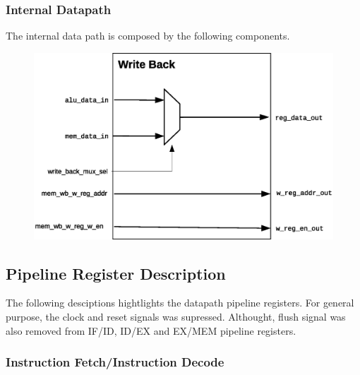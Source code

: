 \documentclass{article}
\begin{document}
  \subsubsection{Internal Datapath} 
  The internal data path is composed by the following components.

  \begin{figure}[H]
    \centering
    \includegraphics[width=\linewidth]{pictures/datapath/wb_datapath.eps}
  \end{figure}      
  
  \newpage
  \subsection{Pipeline Register Description}
  The following desciptions hightlights the datapath pipeline registers. For general purpose, the clock and reset signals was supressed. Althought, flush signal was also removed from IF/ID, ID/EX and EX/MEM pipeline registers.

  \subsubsection{Instruction Fetch/Instruction Decode}
\end{document}
